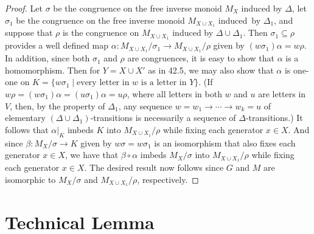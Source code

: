 \documentclass{surv-l}
\numberwithin{equation}{section}
\numberwithin{table}{section}
\numberwithin{figure}{section}
\theoremstyle{definition}
\begin{document}
\begin{proof} Let $\sigma$ be the congruence on the free inverse monoid
$M_{X}$ induced by $\Delta$, let $\sigma_{1}$ be the congruence
on the free inverse monoid $M_{X\cup X_{1}}$ induced~by
$\Delta_{1}$, and suppose that $\rho$ is the congruence on
$M_{X\cup X_{1}}$ induced by $\Delta\cup\Delta_{1}$. Then
$\sigma_{1}\subseteq\rho$ provides a well defined map $\alpha :
M_{X\cup X_{1}}/\sigma_{1}\rightarrow M_{X\cup X_{1}}/\rho$ given
by $(w\sigma_{1})\alpha=w\rho$. In addition, since both
$\sigma_{1}$ and $\rho$ are congruences, it is easy to show that
$\alpha$ is a homomorphism. Then for $Y= X\cup X'$ as in 42.5, we
may also show that $\alpha$ is one-one on $K=\{w\sigma_{1} \mid
\text{every letter in }w\text{ is a letter in }Y\}$. (If
$w\rho=(w\sigma_{1})\alpha=(u\sigma_{1})\alpha=u\rho$, where all
letters in both $w$ and $u$ are letters in $V$, then, by the
property of $\Delta_{1}$, any sequence
$w=w_{1}\rightarrow\cdots\rightarrow w_{k}=u$ of elementary
$(\Delta\cup\Delta_{1})$-transitions is necessarily a
sequence of $\Delta$-transitions.) It follows that
$\alpha|_{K}$ imbeds $K$ into $M_{X\cup X_{1}}/\rho$ while fixing
each generator $ x\in X$. And since $\beta :
M_{X}/\sigma\rightarrow K$ given by $w\sigma =w\sigma_{1}$ is an
isomorphism that also fixes each generator $x\in X$, we have that
$\beta \circ\alpha$ imbeds $M_{X}/\sigma$ into $M_{X\cup
X_{1}}/\rho$ while fixing each generator $ x\in X$. The desired
result now follows since $G$ and $M$ are isomorphic to
$M_{X}/\sigma$ and $M_{X\cup X_{1}}/\rho$, respectively.
\end{proof}

\section{Technical Lemma}\label{sec9.43}
\end{document}
